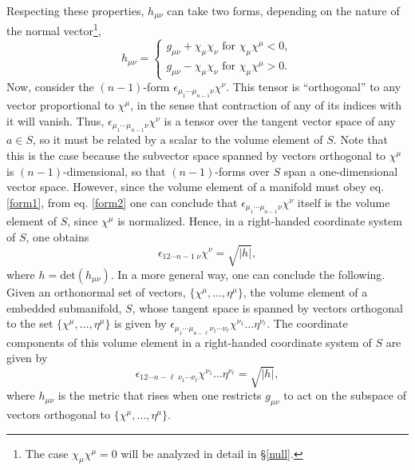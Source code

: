 \documentclass[
12pt,		%
openright,	%
twoside,  %
a4paper,			%
chapter=TITLE,		%
english,			%
french,				%
spanish,			%
brazil				%
]{USPSC-classe/USPSC}
\begin{document}
\begin{apendicesenv}
Respecting these properties, $h_{\mu\nu}$ can take two forms, depending on the nature of the normal vector\footnote{The case $\chi_{\mu}\chi^{\mu}=0$ will be analyzed in detail in \S\;\ref{null}.},
\begin{equation}\label{metric1}
   h_{\mu\nu}=
     \begin{cases}
      g_{\mu\nu}+\chi_{\mu}\chi_{\nu} \text{ for } \chi_{\mu}\chi^{\mu}<0, \\
      g_{\mu\nu}-\chi_{\mu}\chi_{\nu} \text{ for } \chi_{\mu}\chi^{\mu}>0.
    \end{cases}
\end{equation}
Now, consider the $(n-1)$-form $\epsilon_{\mu_1\cdots\mu_{n-1}\nu}\chi^{\nu}$. This tensor is ``orthogonal'' to any vector proportional to $\chi^{\mu}$, in the sense that contraction of any of its indices with it will vanish. Thus, $\epsilon_{\mu_1\cdots\mu_{n-1}\nu}\chi^{\nu}$ is a tensor over the tangent vector space of any $a\in S$, so it must be related by a scalar to the volume element of $S$. Note that this is the case because the subvector space spanned by vectors orthogonal to $\chi^{\mu}$ is $(n-1)$-dimensional, so that $(n-1)$-forms over $S$ span a one-dimensional vector space. However, since the volume element of a manifold must obey eq. \ref{form1}, from eq. \ref{form2} one can conclude that $\epsilon_{\mu_1\cdots\mu_{n-1}\nu}\chi^{\nu}$ itself is the volume element of $S$, since $\chi^{\mu}$ is normalized. Hence, in a right-handed coordinate system of $S$, one obtains
\begin{equation}
    \epsilon_{12\cdots n-1\;\nu}\chi^{\nu}=\sqrt{|h|},
\end{equation}
where $h=\text{det}(h_{\mu\nu})$. In a more general way, one can conclude the following. Given an orthonormal set of vectors, $\{\chi^{\mu},\ldots,\eta^{\mu}\}$, the volume element of a embedded submanifold, $S$, whose tangent space is spanned by vectors orthogonal to the set $\{\chi^{\mu},\ldots,\eta^{\mu}\}$ is given by $\epsilon_{\mu_1\cdots\mu_{n-\ell}\nu_1\cdots\nu_{\ell}}\chi^{\nu_1}\ldots\eta^{\nu_{\ell}}$. The coordinate components of this volume element in a right-handed coordinate system of $S$ are given by 
\begin{equation}\label{volumeexplicit2}
    \epsilon_{12\cdots{n-\ell}\;\nu_1\cdots\nu_{\ell}}\chi^{\nu_1}\ldots\eta^{\nu_{\ell}}=\sqrt{|h|},
\end{equation}
where $h_{\mu\nu}$ is the metric that rises when one restricts $g_{\mu\nu}$ to act on the subspace of vectors orthogonal to $\{\chi^{\mu},\ldots,\eta^{\mu}\}$.


\end{apendicesenv}
\end{document}

